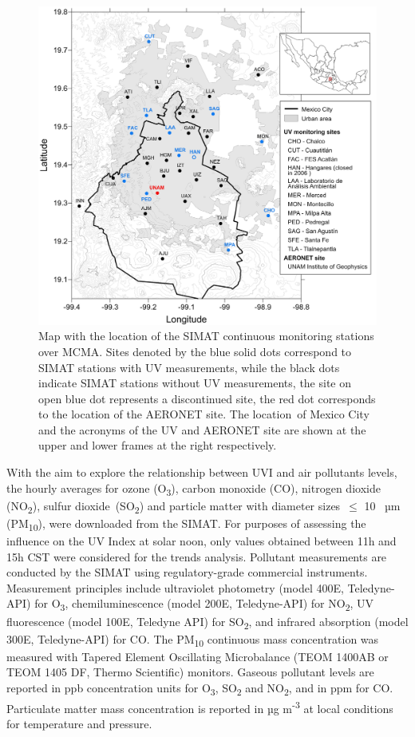 \documentclass[10pt]{article}
\begin{document}
\begin{figure}[H]
  \begin{center}
    \includegraphics[width=0.70\columnwidth]{figures/map}
    \caption{{Map with the location of the SIMAT continuous monitoring stations over
          MCMA. Sites denoted by the blue solid dots correspond to SIMAT stations
          with UV measurements, while the black dots indicate SIMAT stations
          without UV measurements, the site on open blue dot represents a
          discontinued site, the red dot corresponds to the location of the
          AERONET site. The location~of Mexico City and the acronyms of the UV and
          AERONET site are shown at the upper and lower frames at the right
          respectively.
            {\label{977905}}%
        }}
  \end{center}
\end{figure}

With the aim to explore the relationship between UVI and air pollutants
levels, the hourly averages for ozone (O\textsubscript{3}), carbon
monoxide (CO), nitrogen dioxide (NO\textsubscript{2}), sulfur
dioxide~(SO\textsubscript{2}) and particle matter with diameter
sizes~\(\le\) 10 ~µm (PM\textsubscript{10}), were downloaded
from the SIMAT\cite{atmosfrico}. For purposes of assessing the
influence on the UV Index at solar noon, only values obtained between
11h and 15h CST were considered for the trends analysis. Pollutant
measurements are conducted by the SIMAT using regulatory-grade
commercial instruments. Measurement principles include ultraviolet
photometry (model 400E, Teledyne-API) for O\textsubscript{3},
chemiluminescence (model 200E, Teledyne-API) for NO\textsubscript{2}, UV
fluorescence (model 100E, Teledyne API) for SO\textsubscript{2}, and
infrared absorption (model 300E, Teledyne-API) for CO. The
PM\textsubscript{10} continuous mass concentration was measured with
Tapered Element Oscillating Microbalance (TEOM 1400AB or TEOM 1405 DF,
Thermo Scientific) monitors. Gaseous pollutant levels are reported in
ppb concentration units for O\textsubscript{3}, SO\textsubscript{2} and
NO\textsubscript{2}, and in ppm for CO. Particulate matter mass
concentration is reported in µg m\textsuperscript{-3} at local
conditions for temperature and pressure.
\end{document}
